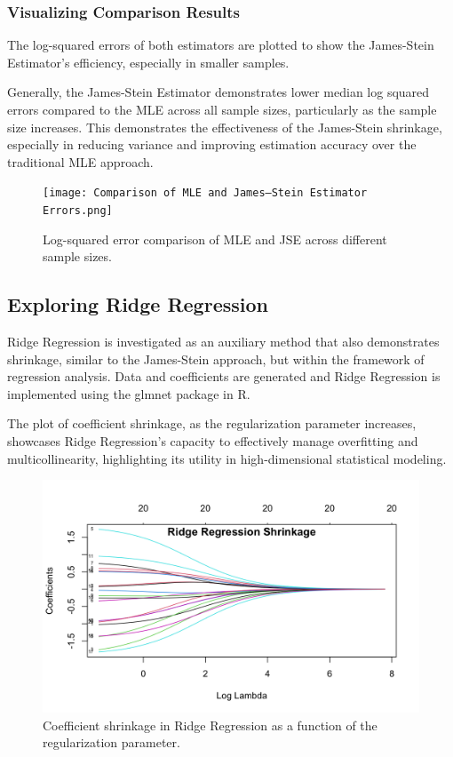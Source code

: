 \subsubsection{Visualizing Comparison Results}

The log-squared errors of both estimators are plotted to show the James-Stein Estimator's efficiency, especially in smaller samples.

Generally, the James-Stein Estimator demonstrates lower median log squared errors compared to the MLE across all sample sizes, particularly as the sample size increases. This demonstrates the effectiveness of the James-Stein shrinkage, especially in reducing variance and improving estimation accuracy over the traditional MLE approach.

\begin{figure}[H]
    \centering
    \texttt{[image: Comparison of MLE and James–Stein Estimator Errors.png]}
    \caption{Log-squared error comparison of MLE and JSE across different sample sizes.}
    \label{fig:estimators_comparison}
\end{figure}

\subsection{Exploring Ridge Regression}

Ridge Regression is investigated as an auxiliary method that also demonstrates shrinkage, similar to the James-Stein approach, but within the framework of regression analysis. Data and coefficients are generated and Ridge Regression is implemented using the glmnet package in R.

The plot of coefficient shrinkage, as the regularization parameter increases, showcases Ridge Regression's capacity to effectively manage overfitting and multicollinearity, highlighting its utility in high-dimensional statistical modeling.

\begin{figure}[H]
    \centering
    \includegraphics[width=1\textwidth]{Ridge Regression Shrinkage.png}
    \caption{Coefficient shrinkage in Ridge Regression as a function of the regularization parameter.}
    \label{fig:ridge_shrinkage}
\end{figure}

